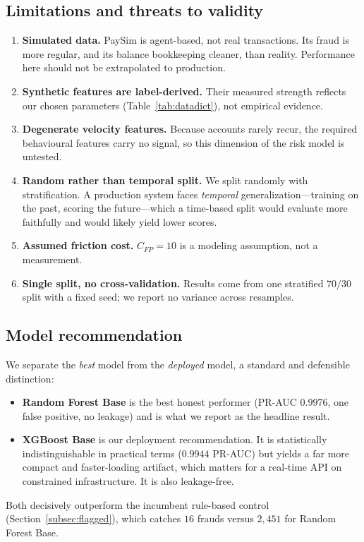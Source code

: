 \documentclass{article}
\begin{document}
\subsection{Limitations and threats to validity}
\begin{enumerate}
    \item \textbf{Simulated data.} PaySim is agent-based, not real
    transactions. Its fraud is more regular, and its balance
    bookkeeping cleaner, than reality. Performance here should not be
    extrapolated to production.
    \item \textbf{Synthetic features are label-derived.} Their measured
    strength reflects our chosen parameters
    (Table~\ref{tab:datadict}), not empirical evidence.
    \item \textbf{Degenerate velocity features.} Because accounts
    rarely recur, the required behavioural features carry no signal, so
    this dimension of the risk model is untested.
    \item \textbf{Random rather than temporal split.} We split
    randomly with stratification. A production system faces
    \emph{temporal} generalization---training on the past, scoring the
    future---which a time-based split would evaluate more faithfully
    and would likely yield lower scores.
    \item \textbf{Assumed friction cost.} $C_{FP} = 10$ is a modeling
    assumption, not a measurement.
    \item \textbf{Single split, no cross-validation.} Results come
    from one stratified $70/30$ split with a fixed seed; we report no
    variance across resamples.
\end{enumerate}

\subsection{Model recommendation}
\label{subsec:recommendation}
We separate the \emph{best} model from the \emph{deployed} model, a
standard and defensible distinction:
\begin{itemize}
    \item \textbf{Random Forest Base} is the best honest performer
    (PR-AUC $0.9976$, one false positive, no leakage) and is what we
    report as the headline result.
    \item \textbf{XGBoost Base} is our deployment recommendation. It is
    statistically indistinguishable in practical terms
    ($0.9944$ PR-AUC) but yields a far more compact and faster-loading
    artifact, which matters for a real-time API on constrained
    infrastructure. It is also leakage-free.
\end{itemize}
Both decisively outperform the incumbent rule-based control
(Section~\ref{subsec:flagged}), which catches $16$ frauds versus
$2{,}451$ for Random Forest Base.
\end{document}
